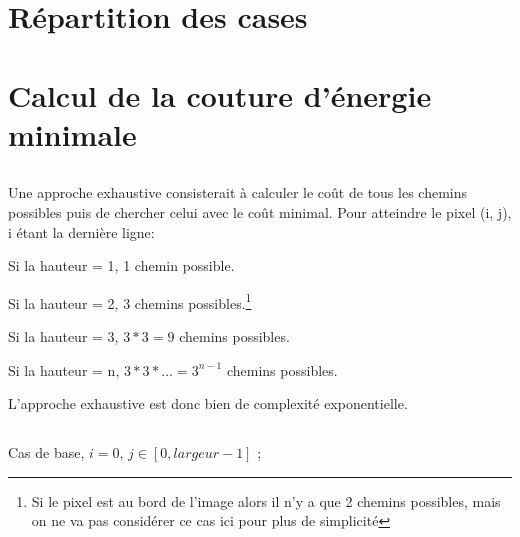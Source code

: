 
\usepackage{clrscode3e}





\section{Répartition des cases} %
\subsection{} %
\subsection{} %
\subsection{} %
\subsection{} %
\subsection{} %

\setcounter{section}{0}

\section{Calcul de la couture d'énergie minimale} %
\subsection{} %
Une approche exhaustive consisterait à calculer le coût de tous les chemins possibles puis de chercher celui avec le coût minimal.
Pour atteindre le pixel (i, j), i étant la dernière ligne:

Si la hauteur = 1, 1 chemin possible.

Si la hauteur = 2, 3 chemins possibles.\footnote{Si le pixel est au bord de l'image alors il n'y a que 2 chemins possibles, mais on ne va pas considérer ce cas ici pour plus de simplicité}

Si la hauteur = 3, $3*3=9$ chemins possibles.

Si la hauteur = n, $3*3*...=3^{n-1}$ chemins possibles.

L'approche exhaustive est donc bien de complexité exponentielle.
\subsection{} %
Cas de base, $i = 0$, $j \in [0, largeur - 1]$ ;

